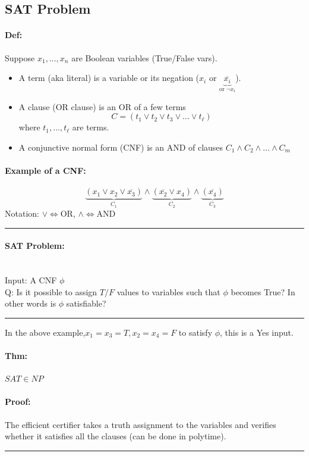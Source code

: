 \documentclass[12 pt]{article}
\begin{document}
          \subsection{SAT Problem}
          \paragraph{Def:} Suppose $x_1, \ldots, x_n$ are Boolean
          variables (True/False vars).
          \begin{itemize}
          \item A term (aka literal) is a variable or its negation
            ($x_i$ or $\underbrace{\overline{x_i}}_{\text{or }\neg
              x_i}$).
          \item A clause (OR clause) is an OR of a few terms
            $$C=(t_1 \lor t_2 \lor t_3 \lor \ldots \lor t_{\ell})$$
            where $t_1, \ldots, t_{\ell}$ are terms.
          \item A conjunctive normal form (CNF) is an AND of clauses
            $C_1 \land C_2 \land \ldots \land C_m$
          \end{itemize}
          \paragraph{Example of a CNF:}
          $$\underbrace{(x_1 \lor x_2 \lor \overline{x_3})}_{C_1}
          \land \underbrace{(\overline{x_2} \lor x_4)}_{C_2} \land
          \underbrace{(\overline{x_4})}_{C_3}$$
          Notation: $\lor \iff $OR, $\land \iff $AND
          \\ \noindent \rule{\textwidth}{0.5pt}
          \paragraph{SAT Problem:}~
          \\ Input: A CNF $\phi$
          \\ Q: Is it possible to assign $T/F$ values to variables
          such that $\phi$ becomes True? In other words is $\phi$
          satisfiable?
          \\ \noindent \rule{\textwidth}{0.5pt}
          In the above example,$x_1 = x_3 = T, x_2 = x_4 = F$ to
          satisfy $\phi$, this is a Yes input.
          \paragraph{Thm:} $SAT \in NP$
          \paragraph{Proof:} The efficient certifier takes a truth
          assignment to the variables and verifies whether it
          satisfies all the clauses (can be done in polytime).
          \\ \noindent \rule{\textwidth}{0.5pt}
\end{document}
